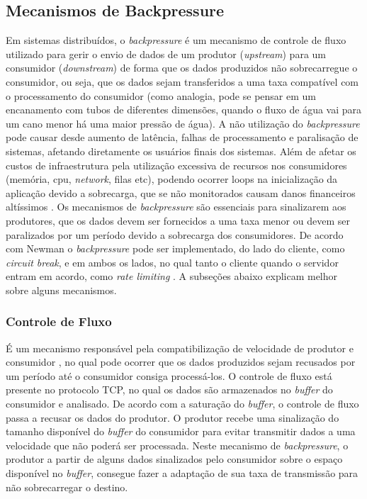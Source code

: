 \documentclass[12pt]{article}
\begin{document}
  \subsection{Mecanismos de Backpressure}
  Em sistemas distribuídos, o \textit{backpressure} é um mecanismo de controle de fluxo utilizado para gerir o envio de dados de um produtor (\textit{upstream}) para um consumidor (\textit{downstream}) de forma que os dados produzidos não sobrecarregue o consumidor, ou seja, que os dados sejam transferidos a uma taxa compatível com o processamento do consumidor \cite{fischer2022Grokking} (como analogia, pode se pensar em um encanamento com tubos de diferentes dimensões, quando o fluxo de água vai para um cano menor há uma maior pressão de água). A não utilização do \textit{backpressure} pode causar desde aumento de latência, falhas de processamento e paralisação de sistemas, afetando diretamente os usuários finais dos sistemas. Além de afetar os custos de infraestrutura pela utilização excessiva de recursos nos consumidores (memória, cpu, \textit{network}, filas etc), podendo ocorrer loops na inicialização da aplicação devido a sobrecarga, que se não monitorados causam danos financeiros altíssimos \cite{newmanResilientds}. Os mecanismos de \textit{backpressure} são essenciais para sinalizarem aos produtores, que os dados devem ser fornecidos a uma taxa menor ou devem ser paralizados por um período devido a sobrecarga dos consumidores. De acordo com Newman o \textit{backpressure} pode ser implementado, do lado do cliente, como \textit{circuit break}, e em ambos os lados, no qual tanto o cliente quando o servidor entram em acordo, como \textit{rate limiting} \cite{newmanResilientds}. A subseções abaixo explicam melhor sobre alguns mecanismos.

  \subsubsection{Controle de Fluxo}
  É um mecanismo responsável pela compatibilização de velocidade de produtor e consumidor \cite{kurose2013redes}, no qual pode ocorrer que os dados produzidos sejam recusados por um período até o consumidor consiga processá-los. O controle de fluxo está presente no protocolo TCP, no qual os dados são armazenados no \textit{buffer} do consumidor e analisado. De acordo com a saturação do \textit{buffer}, o controle de fluxo passa a recusar os dados do produtor. O produtor recebe uma sinalização do tamanho disponível do \textit{buffer} do consumidor para evitar transmitir dados a uma velocidade que não poderá ser processada. Neste mecanismo de \textit{backpressure}, o produtor a partir de alguns dados sinalizados pelo consumidor sobre o espaço disponível no \textit{buffer}, consegue fazer a adaptação de sua taxa de transmissão para não sobrecarregar o destino.
\end{document}
